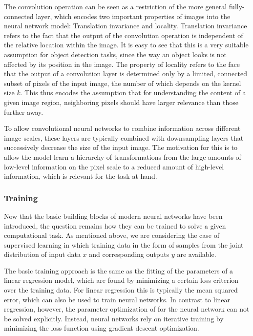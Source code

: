 \begin{description}
The convolution operation can  be seen as a restriction of the more general
fully-connected layer, which encodes two important properties of images into the
neural network model: Translation invariance and locality. Translation
invariance refers to the fact that the output of the convolution operation is
independent of the relative location within the image. It is easy to see that
this is a very suitable assumption for object detection tasks, since the way an
object looks is not affected by its position in the image. The property of
locality refers to the face that the output of a convolution layer is determined
only by a limited, connected subset of pixels of the input image, the number of
which depends on the kernel size $k$. This thus encodes the assumption that for
understanding the content of a given image region, neighboring pixels should
have larger relevance than those further away.

To allow convolutional neural networks to combine information across different
image scales, these layers are typically combined with downsampling layers that
successively decrease the size of the input image. The motivation for this is to
allow the model learn a hierarchy of transformations from the large amounts of
low-level information on the pixel scale to a reduced amount of high-level
information, which is relevant for the task at hand.

\subsubsection{Training}

Now that the basic building blocks of modern neural networks have been
introduced, the question remains how they can be trained to solve a given
computational task. As mentioned above, we are considering the case of
supervised learning in which training data in the form of samples from the joint
distribution of input data $x$ and corresponding outputs $y$ are available.

The basic training approach is the same as the fitting of the parameters of a
linear regression model, which are found by minimizing a certain loss criterion
over the training data. For linear regression this is typically the mean squared
error, which  can also be used to train neural networks. In contrast to linear
regression, however, the parameter optimization of for the neural network can
not be solved explicitly. Instead, neural networks rely on iterative training by
minimizing the loss function using gradient descent optimization.


\end{description}
